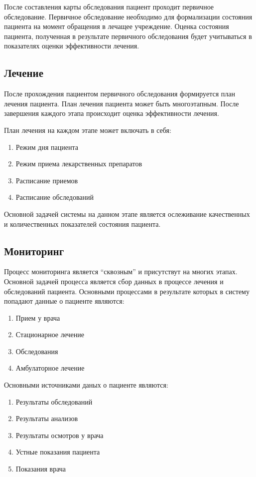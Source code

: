 После составления карты обследования пациент проходит первичное обследование.
Первичное обследование необходимо для формализации состояния пациента на момент
обращения в лечащее учреждение. Оценка состояния пациента, полученная в
результате первичного обследования будет учитываться в показателях оценки
эффективности лечения.

\subsection{Лечение}
После прохождения пациентом первичного обследования формируется план лечения
пациента. План лечения пациента может быть многоэтапным. После завершения
каждого этапа происходит оценка эффективности лечения.

План лечения на каждом этапе может включать в себя:

\begin{enumerate}
  \item Режим дня пациента
  \item Режим приема лекарственных препаратов
  \item Расписание приемов
  \item Расписание обследований    
\end{enumerate}

Основной задачей системы на данном этапе является ослеживание качественных и
количественных показателей состояния пациента.

\subsection{Мониторинг}
Процесс мониторинга является “сквозным” и присутствут на многих этапах. Основной
задачей процесса является сбор данных в процессе лечения и обследований
пациента.
Основными процессами в результате которых в систему попадают данные о пациенте
являются:

\begin{enumerate}
  \item Прием у врача
  \item Стационарное лечение
  \item Обследования
  \item Амбулаторное лечение 
\end{enumerate}

Основными источниками даных о пациенте являются:

\begin{enumerate}
  \item Результаты обследований
  \item Результаты анализов
  \item Результаты осмотров у врача
  \item Устные показания пациента
  \item Показания врача 
\end{enumerate}


